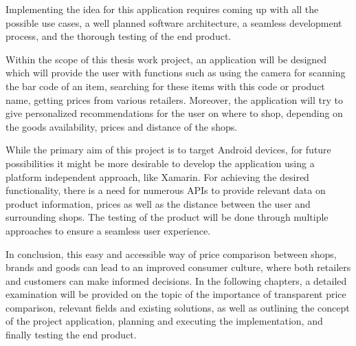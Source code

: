 Implementing the idea for this application requires coming up with all the possible use cases, a well planned  software architecture, a seamless development process, and the thorough testing of the end product. 

Within the scope of this thesis work project, an application will be designed which will provide the user with functions such as using the camera for scanning the bar code of an item, searching for these items with this code or product name, getting prices from various retailers. Moreover, the application will try to give personalized recommendations for the user on where to shop, depending on the goods availability, prices and distance of the shops.

While the primary aim of this project is to target Android devices, for future possibilities it might be more desirable to develop the application using a platform independent approach, like Xamarin. For achieving the desired functionality, there is a need for numerous APIs to provide relevant data on product information, prices as well as the distance between the user and surrounding shops. The testing of the product will be done through multiple approaches to ensure a seamless user experience.

In conclusion, this easy and accessible way of price comparison between shops, brands and goods can lead to an improved consumer culture, where both retailers and customers can make informed decisions. In the following chapters, a detailed examination will be provided on the topic of the importance of transparent price comparison, relevant fields and existing solutions, as well as outlining the concept of the project application, planning and executing the implementation, and finally testing the end product.



